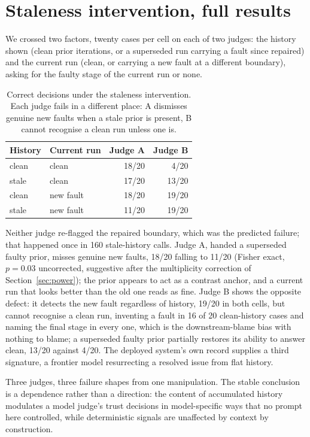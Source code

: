 \section{Staleness intervention, full results}
\label{app:stale}


We crossed two factors, twenty cases per cell on each of two judges: the history shown
(clean prior iterations, or a superseded run carrying a fault since repaired) and the
current run (clean, or carrying a new fault at a different boundary), asking for the
faulty stage of the current run or none.

\begin{table}[h]
\centering
\begin{tabular}{llrr}
\toprule
History & Current run & Judge A & Judge B \\
\midrule
clean & clean     & 18/20 & 4/20 \\
stale & clean     & 17/20 & 13/20 \\
clean & new fault & 18/20 & 19/20 \\
stale & new fault & 11/20 & 19/20 \\
\bottomrule
\end{tabular}
\caption{Correct decisions under the staleness intervention. Each judge fails in a
different place: A dismisses genuine new faults when a stale prior is present, B cannot
recognise a clean run unless one is.}
\label{tab:stale}
\end{table}

Neither judge re-flagged the repaired boundary, which was the predicted failure; that
happened once in 160 stale-history calls. Judge A, handed a superseded faulty prior,
misses genuine new faults, 18/20 falling to 11/20 (Fisher exact, $p=0.03$ uncorrected,
suggestive after the multiplicity correction of Section~\ref{sec:power}); the prior appears
to act as a contrast anchor, and a current run that looks better than the old one reads as
fine. Judge B shows the opposite defect: it detects the new fault regardless of history,
19/20 in both cells, but cannot recognise a clean run, inventing a fault in 16 of 20
clean-history cases and naming the final stage in every one, which is the downstream-blame
bias with nothing to blame; a superseded faulty prior partially restores its ability to
answer clean, 13/20 against 4/20. The deployed system's own record supplies a third
signature, a frontier model resurrecting a resolved issue from flat history.

Three judges, three failure shapes from one manipulation. The stable conclusion is a
dependence rather than a direction: the content of accumulated history modulates a model
judge's trust decisions in model-specific ways that no prompt here controlled, while
deterministic signals are unaffected by context by construction.
